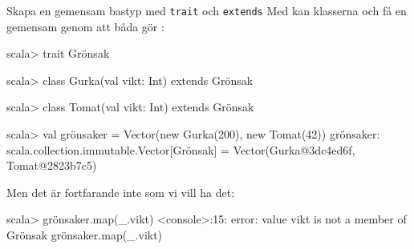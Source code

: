 \begin{Slide}{Skapa en gemensam bastyp med \texttt{trait} och \texttt{extends}}\SlideFontSmall
Med  kan klasserna  och  få en gemensam  genom att båda  gör :
\begin{REPL}
scala> trait Grönsak

scala> class Gurka(val vikt: Int) extends Grönsak

scala> class Tomat(val vikt: Int) extends Grönsak

scala> val grönsaker = Vector(new Gurka(200), new Tomat(42))
grönsaker: scala.collection.immutable.Vector[Grönsak] = 
  Vector(Gurka@3dc4ed6f, Tomat@2823b7c5)


\end{REPL}
\pause
Men det är fortfarande inte som vi vill ha det:
\begin{REPLnonum}
scala> grönsaker.map(_.vikt)
<console>:15: error: value vikt is not a member of Grönsak
       grönsaker.map(_.vikt)
\end{REPLnonum}
\end{Slide}



